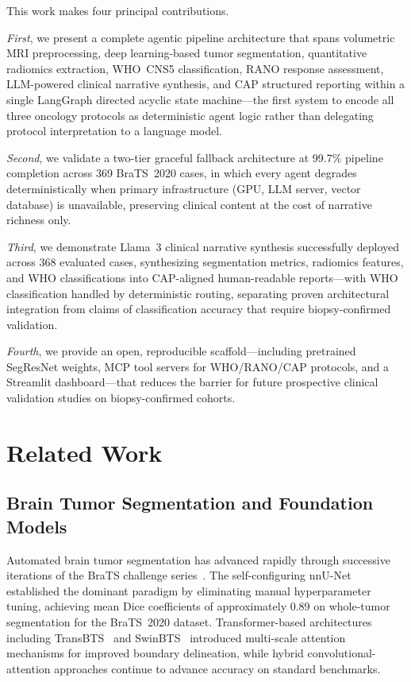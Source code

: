 \documentclass[journal]{IEEEtran}
\begin{document}
This work makes four principal contributions.

\textit{First}, we present a complete agentic pipeline architecture that
spans volumetric MRI preprocessing, deep learning-based tumor segmentation,
quantitative radiomics extraction, WHO~CNS5 classification, RANO response
assessment, LLM-powered clinical narrative synthesis, and CAP structured
reporting within a single LangGraph directed acyclic state machine---the
first system to encode all three oncology protocols as deterministic agent
logic rather than delegating protocol interpretation to a language model.

\textit{Second}, we validate a two-tier graceful fallback architecture at
99.7\% pipeline completion across 369 BraTS~2020 cases, in which every
agent degrades deterministically when primary infrastructure (GPU, LLM
server, vector database) is unavailable, preserving clinical content at the
cost of narrative richness only.

\textit{Third}, we demonstrate Llama~3 clinical narrative synthesis
successfully deployed across 368 evaluated cases, synthesizing segmentation
metrics, radiomics features, and WHO classifications into CAP-aligned
human-readable reports---with WHO classification handled by deterministic
routing, separating proven architectural integration from claims of
classification accuracy that require biopsy-confirmed validation.

\textit{Fourth}, we provide an open, reproducible scaffold---including
pretrained SegResNet weights, MCP tool servers for WHO/RANO/CAP protocols,
and a Streamlit dashboard---that reduces the barrier for future prospective
clinical validation studies on biopsy-confirmed cohorts.

\section{Related Work}

\subsection{Brain Tumor Segmentation and Foundation Models}

Automated brain tumor segmentation has advanced rapidly through successive
iterations of the BraTS challenge series~\cite{menze2015,bakas2018}. The
self-configuring nnU-Net~\cite{isensee2021} established the dominant
paradigm by eliminating manual hyperparameter tuning, achieving mean Dice
coefficients of approximately 0.89 on whole-tumor segmentation for the
BraTS~2020 dataset. Transformer-based architectures including
TransBTS~\cite{wang2021} and SwinBTS~\cite{jiang2022} introduced
multi-scale attention mechanisms for improved boundary delineation, while
hybrid convolutional-attention approaches continue to advance accuracy on
standard benchmarks.
\end{document}
